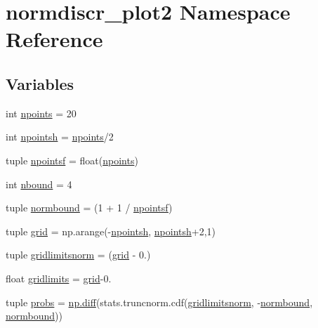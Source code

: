 \hypertarget{namespacenormdiscr__plot2}{}\section{normdiscr\+\_\+plot2 Namespace Reference}
\label{namespacenormdiscr__plot2}
\subsection*{Variables}
\begin{DoxyCompactItemize}
\item 
int \hyperlink{namespacenormdiscr__plot2_a5eedafe3a4e06177c196101c8886ba1f}{npoints} = 20
\item 
int \hyperlink{namespacenormdiscr__plot2_ae9b2c28b1212df96f1a41fd298ad4390}{npointsh} = \hyperlink{namespacenormdiscr__plot2_a5eedafe3a4e06177c196101c8886ba1f}{npoints}/2
\item 
tuple \hyperlink{namespacenormdiscr__plot2_abb90b23055cbc2713f40e135104e4a54}{npointsf} = float(\hyperlink{namespacenormdiscr__plot2_a5eedafe3a4e06177c196101c8886ba1f}{npoints})
\item 
int \hyperlink{namespacenormdiscr__plot2_a75e9153d69cb7c81a7ce8a505f2aa7ae}{nbound} = 4
\item 
tuple \hyperlink{namespacenormdiscr__plot2_a1d8a343b3fc043bbc9cd58f5e5649453}{normbound} = (1 + 1 / \hyperlink{namespacenormdiscr__plot2_abb90b23055cbc2713f40e135104e4a54}{npointsf})
\item 
tuple \hyperlink{namespacenormdiscr__plot2_a62ec823ef29766de66e391bd4a2dc284}{grid} = np.\+arange(-\/\hyperlink{namespacenormdiscr__plot2_ae9b2c28b1212df96f1a41fd298ad4390}{npointsh}, \hyperlink{namespacenormdiscr__plot2_ae9b2c28b1212df96f1a41fd298ad4390}{npointsh}+2,1)
\item 
tuple \hyperlink{namespacenormdiscr__plot2_a88023cbc8a6175f64d36ce073d725556}{gridlimitsnorm} = (\hyperlink{namespacenormdiscr__plot2_a62ec823ef29766de66e391bd4a2dc284}{grid} -\/ 0.)
\item 
float \hyperlink{namespacenormdiscr__plot2_a64e64095e5aa8deecc32daac5b046c2a}{gridlimits} = \hyperlink{namespacenormdiscr__plot2_a62ec823ef29766de66e391bd4a2dc284}{grid}-\/0.
\item 
tuple \hyperlink{namespacenormdiscr__plot2_a5548df286332e74becd4b4e305f43984}{probs} = \hyperlink{nnls_8f_a09a61e17e6534125097a72c24ec1380b}{np.\+diff}(stats.\+truncnorm.\+cdf(\hyperlink{namespacenormdiscr__plot2_a88023cbc8a6175f64d36ce073d725556}{gridlimitsnorm}, -\/\hyperlink{namespacenormdiscr__plot2_a1d8a343b3fc043bbc9cd58f5e5649453}{normbound}, \hyperlink{namespacenormdiscr__plot2_a1d8a343b3fc043bbc9cd58f5e5649453}{normbound}))

\end{DoxyCompactItemize}

